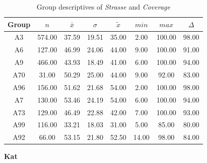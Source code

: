 \begin{table}[ht]
	\tiny
	\centering
	\begin{tabular}{c|c|c|c|c|c|c|c}
	  	\toprule
	 	Group & $n$ & $\bar{x}$ & $\sigma$ & $\tilde{x}$ & $min$ & $max$ & $\Delta$ \\   
	  	\midrule
		A3 & 574.00 & 37.59 & 19.51 & 35.00 & 2.00 & 100.00 & 98.00 \\ 
	  	A6 & 127.00 & 46.99 & 24.06 & 44.00 & 9.00 & 100.00 & 91.00 \\ 
	  	A9 & 466.00 & 43.93 & 18.49 & 41.00 & 6.00 & 100.00 & 94.00 \\ 
	  	A70 & 31.00 & 50.29 & 25.00 & 44.00 & 9.00 & 92.00 & 83.00 \\ 
	  	A96 & 156.00 & 51.62 & 21.68 & 54.00 & 2.00 & 100.00 & 98.00 \\ 
	  	A7 & 130.00 & 53.46 & 24.19 & 54.00 & 6.00 & 100.00 & 94.00 \\ 
	  	A73 & 129.00 & 46.49 & 22.88 & 42.00 & 7.00 & 100.00 & 93.00 \\ 
	  	A99 & 116.00 & 33.21 & 18.03 & 31.00 & 5.00 & 85.00 & 80.00 \\ 
	  	A92 & 66.00 & 53.15 & 21.80 & 52.50 & 14.00 & 98.00 & 84.00 \\ 
	  	\bottomrule
	\end{tabular}
	\caption{Group descriptives of \textit{Strasse} and \textit{Coverage}}
	\label{tbl:descriptives_baysis_matched_Strasse_Cov}
\end{table}

\Large
\centerline{\textbf{Kat}}
\normalsize

